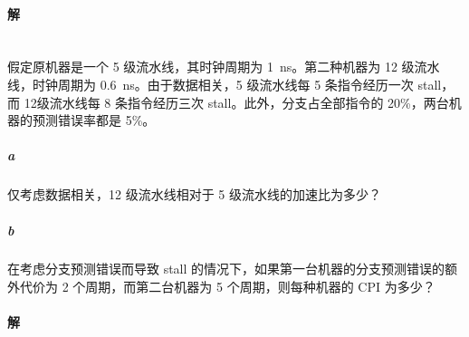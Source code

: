 \documentclass{article}
\begin{document}
\paragraph{解}

\section{}
假定原机器是一个 5 级流水线，其时钟周期为 \SI{1}{\nano\second}。第二种机器为 12 级流水线，时钟周期为 \SI{0.6}{\nano\second}。由于数据相关，5 级流水线每 5 条指令经历一次 stall，而 12级流水线每 8 条指令经历三次 stall。此外，分支占全部指令的 20\%，两台机器的预测错误率都是 5\%。
\subparagraph{a} 仅考虑数据相关，12 级流水线相对于 5 级流水线的加速比为多少？
\subparagraph{b} 在考虑分支预测错误而导致 stall 的情况下，如果第一台机器的分支预测错误的额外代价为 2 个周期，而第二台机器为 5 个周期，则每种机器的 CPI 为多少？

\paragraph{解}
\end{document}
